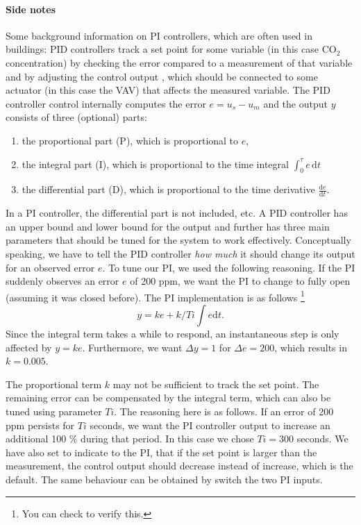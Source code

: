\documentclass[10pt,a4paper]{article}
\begin{document}
\paragraph{Side notes}
Some background information on PI controllers, 
which are often used in buildings: 
PID controllers track a set point for some variable (in this case CO$_2$ concentration)  
by checking the error compared to a measurement of that variable 
and by adjusting the control output , which should be connected
to some actuator (in this case the VAV) that affects the measured variable.
The PID controller control internally computes the error $e=u_s-u_m$
and the output $y$ consists of three (optional) parts: 
\begin{enumerate}
\item the proportional part (P), which is proportional to $e$,
\item the integral part (I), which is proportional to the time integral $\int_0^\tau e \, \mathrm{d}t$
\item the differential part (D), which is proportional to the time derivative $\frac{ \mathrm{d} e}{ \mathrm{d} t}$.
\end{enumerate}
In a PI controller, the differential part is not included, etc.
A PID controller has an upper bound and lower bound for the output 
and further has three main parameters that should be tuned
for the system to work effectively.
Conceptually speaking, we have to tell the PID controller \textit{how much} it
should change its output for an observed error $e$.
To tune our PI, we used the following reasoning.
If the PI suddenly observes an error $e$ of 200 ppm,
we want the PI to change to fully open (assuming it was closed before).
The PI implementation is as follows 
\footnote{You can check  to verify this.}
\begin{equation}
y = ke + k/Ti\int e\mathrm{d}t.
\end{equation}
Since the integral term takes a while to respond,
an instantaneous step is only affected by $y=ke$.
Furthermore, we want $\Delta y = 1$  for $\Delta e = 200$,
which results in $k=0.005$.

The proportional term $k$ may not be sufficient
to track the set point. 
The remaining error can be compensated by the integral term, 
which can also be tuned using parameter $Ti$.
The reasoning here is as follows.
If an error of 200 ppm persists for $Ti$ seconds,
we want the PI controller output to increase an additional 100 \% 
during that period.
In this case we chose $Ti=300$ seconds.
We have also set  to indicate to the PI,
that if the set point is larger than the measurement, the control output should
decrease instead of increase, which is the default. The same behaviour
can be obtained by  switch the two PI inputs.\\
\end{document}
